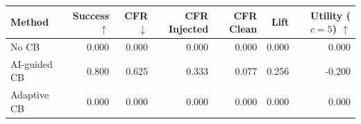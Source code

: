 \begin{tabular}{lrrrrrr}
\toprule
Method & Success $\uparrow$ & CFR $\downarrow$ & CFR Injected & CFR Clean & Lift & Utility ($c=5$) $\uparrow$ \\
\midrule
No CB & 0.000 & 0.000 & 0.000 & 0.000 & 0.000 & 0.000 \\
AI-guided CB & 0.800 & 0.625 & 0.333 & 0.077 & 0.256 & -0.200 \\
Adaptive CB & 0.000 & 0.000 & 0.000 & 0.000 & 0.000 & 0.000 \\
\bottomrule
\end{tabular}
